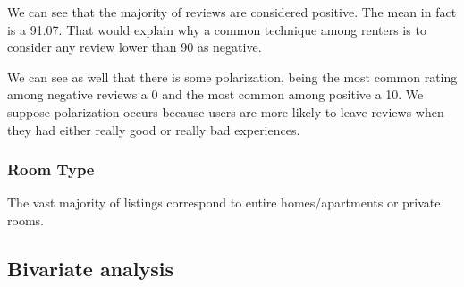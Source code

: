 


We can see that the majority of reviews are considered positive. The mean in fact is 
a 91.07. That would explain why a common technique among renters is to consider 
any review lower than 90 as negative. 

We can see as well that there is some polarization, being the most common rating among 
negative reviews a 0 and the most common among positive a 10. We suppose polarization occurs
because users are more likely to leave reviews when they had either really good or 
really bad experiences.




\pagebreak
\subsubsection{Room Type}


The vast majority of listings correspond to entire homes/apartments or private rooms.

\pagebreak
\subsection{Bivariate analysis}%
\label{sub:bivariate_analysis}


